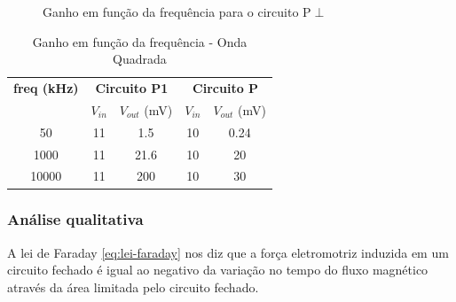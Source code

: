 \documentclass[12pt]{article}
\begin{document}
\begin{figure}[H]
  \captionsetup{name=Gráfico}
  \centering
  \caption{Ganho em função da frequência para o circuito P$\perp$}
  \label{fig:ganho-frequencia-pperp} %
\end{figure}

\begin{table}[htbp]
  \centering
  \begin{tabular}{c|cc|cc}
    \toprule
    \textbf{freq (kHz)} & \multicolumn{2}{c|}{\textbf{Circuito P1}} &
    \multicolumn{2}{c}{\textbf{Circuito P}} \\
    & $V_{in}$ & $V_{out}$ (mV) & $V_{in}$ & $V_{out}$ (mV) \\
    \midrule
    50      & 11   & 1.5   & 10 & 0.24 \\
    1000    & 11   & 21.6  & 10 & 20   \\
    10000   & 11   & 200   & 10 & 30   \\
    \bottomrule
  \end{tabular}
  \caption{Ganho em função da frequência - Onda Quadrada}
  \label{tab:ganho-onda-quadrada}
\end{table}

\subsubsection{Análise qualitativa}
A lei de Faraday \ref{eq:lei-faraday} nos diz que a força
eletromotriz induzida em um circuito
fechado é igual ao negativo da variação no tempo do fluxo magnético através da
área limitada pelo circuito fechado.
\end{document}
